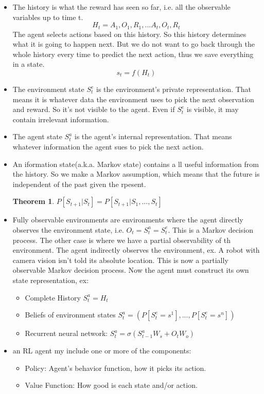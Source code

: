 \documentclass[a4paper]{article}
\newtheorem{theorem}{Theorem}
\begin{document}
\begin{itemize}
\item The history is what the reward has seen so far, i.e. all the observable variables up to time t. 
$$ H_t = A_1, O_1, R_1,...A_t, O_t, R_t$$
The agent selects actions based on this history. So this history determines what it is going to happen next. But we do not want to go back through the whole history every time to predict the next action, thus we save everything in a state. 
$$ s_t = f(H_t)$$
\item The environment state $S_t^e$ is the environment's private representation. That means it is whatever data the environment uses to pick the next observation and reward. So it's not visible to the agent. Even if $S_t^e$ is visible, it may contain irrelevant information. 
\item The agent state $S_t^a$ is the agent's internal representation. That means whatever information the agent sues to pick the next action. 
\item An iformation state(a.k.a. Markov state) contains a ll useful information from the history. So we make a Markov assumption, which means that the future is independent of the past given the rpesent. 
\begin{theorem}
$P[S_{t+1}|S_t] = P[S_{t+1}| S_1,...,S_t]$
\end{theorem}
\item Fully observable environments are environments where the agent directly observes the environment state, i.e. $O_t = S_t^a = S_t^e$.
This is a Markov decision process. 
The other case is where we have a partial observability of th environment. The agent indirectly observes the environment, ex. A robot with camera vision isn't told its absolute location.  This is now a partially observable Markov decision process. 
Now the agent must construct its own state representation, ex:
\begin{itemize}
\item Complete History $S_t^a = H_t$
\item Beliefs of environment states $S_t^a = (P[S_t^e = s^1],...,P[S_t^e = s^n])$
\item Recurrent neural network: $S_t^a = \sigma(S_{t-1}^a W_s + O_t W_o)$ 
\end{itemize}
\item an RL agent my include one or more of the components: 
\begin{itemize}
\item Policy: Agent's behavior function, how it picks its action.
\item Value Function: How good is each state and/or action.

\end{itemize}
\end{itemize}
\end{document}

